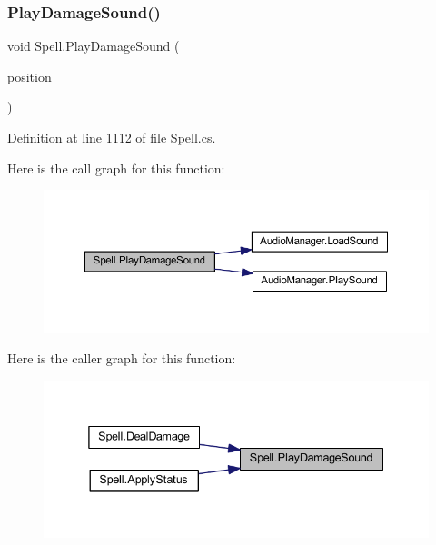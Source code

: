 \subsubsection{\texorpdfstring{PlayDamageSound()}{PlayDamageSound()}}
{\footnotesize\ttfamily void Spell.\+Play\+Damage\+Sound (\begin{DoxyParamCaption}\item[{Vector2\+Int}]{position }\end{DoxyParamCaption})}



Definition at line 1112 of file Spell.\+cs.

Here is the call graph for this function\+:
\nopagebreak
\begin{figure}[H]
\begin{center}
\leavevmode
\includegraphics[width=350pt]{class_spell_a80aa52e9ed4b3555bd04682d93bc5049_cgraph}
\end{center}
\end{figure}
Here is the caller graph for this function\+:
\nopagebreak
\begin{figure}[H]
\begin{center}
\leavevmode
\includegraphics[width=338pt]{class_spell_a80aa52e9ed4b3555bd04682d93bc5049_icgraph}
\end{center}
\end{figure}
\mbox{\label{class_spell_a1dfbc90153df551bd995b8b852f808f0}} 
